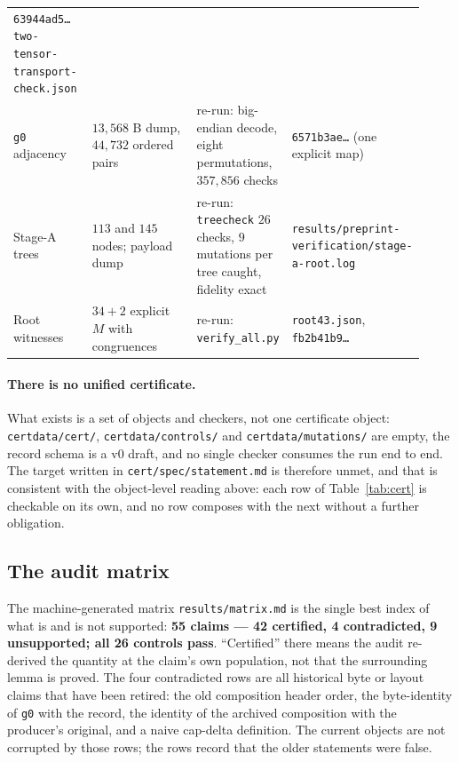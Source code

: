 \documentclass[10pt]{article}
\theoremstyle{definition}
\newcommand{\file}[1]{\texttt{\small #1}}
\begin{document}
\begin{center}
\begin{longtable}{@{}L{0.20\linewidth}L{0.34\linewidth}L{0.16\linewidth}L{0.22\linewidth}@{}}
\texttt{63944ad5\ldots} \file{two-\allowbreak{}tensor-\allowbreak{}transport-\allowbreak{}check.json} \\
\texttt{g0} adjacency & $13{,}568$ B dump, $44{,}732$ ordered pairs & re-run: big-endian decode, eight
permutations, $357{,}856$ checks & \texttt{6571b3ae\ldots} (one explicit map) \\
Stage-A trees & $113$ and $145$ nodes; payload dump & re-run: \file{treecheck} $26$ checks, $9$
mutations per tree caught, fidelity exact & \file{results/\allowbreak{}preprint-\allowbreak{}verification/\allowbreak{}stage-\allowbreak{}a-\allowbreak{}root.log} \\
Root witnesses & $34+2$ explicit $M$ with congruences & re-run: \file{verify\_all.py} &
\file{root43.json}, \texttt{fb2b41b9\ldots} \\
\bottomrule
\end{longtable}
\end{center}

\paragraph{There is no unified certificate.} What exists is a set of objects and checkers, not one
certificate object: \file{certdata/cert/}, \file{certdata/controls/} and \file{certdata/mutations/} are
empty, the record schema is a v0 draft, and no single checker consumes the run end to end. The target
written in \file{cert/spec/statement.md} is therefore unmet, and that is consistent with the object-level
reading above: each row of Table~\ref{tab:cert} is checkable on its own, and no row composes with the
next without a further obligation.

\subsection{The audit matrix}
The machine-generated matrix \file{results/\allowbreak{}matrix.md} is the single best index of what is and is not
supported: \textbf{55 claims --- 42 certified, 4 contradicted, 9 unsupported; all 26 controls pass}.
``Certified'' there means the audit re-derived the quantity at the claim's own population, not that the
surrounding lemma is proved. The four contradicted rows are all historical byte or layout claims that
have been retired: the old composition header order, the byte-identity of \texttt{g0} with the record,
the identity of the archived composition with the producer's original, and a naive cap-delta
definition. The current objects are not corrupted by those rows; the rows record that the older
statements were false.
\end{document}
